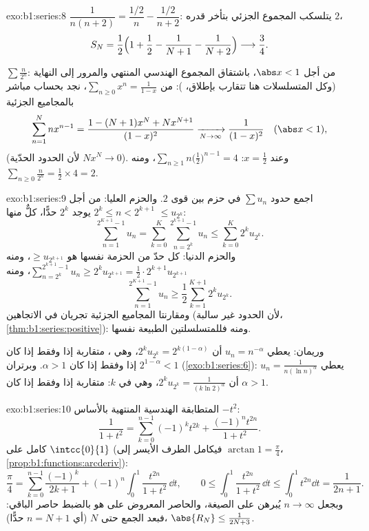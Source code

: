 \begin{solution}{exo:b1:series:8}
$\dfrac{1}{n(n+2)} = \dfrac{1/2}{n} - \dfrac{1/2}{n+2}$: يتلسكب المجموع
الجزئي بتأخر قدره $2$،
\[
S_N = \frac12\Bigl(1 + \frac12 - \frac{1}{N+1} -
\frac{1}{N+2}\Bigr) \longrightarrow \frac34 .
\]

$\sum \frac{n}{2^n}$: من أجل $\abs x < 1$، باشتقاق المجموع
الهندسي المنتهي والمرور إلى النهاية (وكل المتسلسلات هنا تتقارب
بإطلاق، ): من $\sum_{n\geq0} x^n = \frac{1}{1-x}$،
نجد بحساب مباشر بالمجاميع الجزئية
\[
\sum_{n=1}^{N} n x^{n-1}
= \frac{1 - (N+1)x^N + N x^{N+1}}{(1 - x)^2}
\xrightarrow[N\to\infty]{} \frac{1}{(1-x)^2}
\quad (\abs x < 1),
\]
(لأن الحدود الحدّية $N x^N \to 0$). وعند $x = \frac12$:
$\sum_{n\geq1} n\bigl(\frac12\bigr)^{n-1} = 4$، ومنه $\sum_{n\geq0}
\frac{n}{2^n} = \frac12 \times 4 = 2$.
\end{solution}

\begin{solution}{exo:b1:series:9}
اجمع حدود $\sum u_n$ في حزم بين قوى $2$.
والحزم العليا: من أجل $2^k \leq n < 2^{k+1}$ يوجد $2^k$ حدًّا،
كلٌّ منها $\leq u_{2^k}$:
\[
\sum_{n=1}^{2^{K+1}-1} u_n
= \sum_{k=0}^{K} \sum_{n=2^k}^{2^{k+1}-1} u_n
\leq \sum_{k=0}^{K} 2^k u_{2^k} .
\]
والحزم الدنيا: كل حدّ من الحزمة نفسها هو $\geq u_{2^{k+1}}$،
ومنه $\sum_{n=2^k}^{2^{k+1}-1} u_n \geq 2^k u_{2^{k+1}} = \frac12
\cdot 2^{k+1} u_{2^{k+1}}$، ومنه
\[
\sum_{n=1}^{2^{K+1}-1} u_n \geq \frac12 \sum_{k=1}^{K+1} 2^{k}
u_{2^{k}} .
\]
ومقارنتا المجاميع الجزئية تجريان في الاتجاهين (لأن الحدود غير سالبة،
\cref{thm:b1:series:positive}): ومنه فللمتسلسلتين الطبيعة نفسها.

وريمان: يعطي $u_n = n^{-\alpha}$ أن $2^k u_{2^k} =
2^{k(1-\alpha)}$، وهي ، متقاربة إذا وفقط إذا كان $2^{1 - \alpha}
< 1$ إذا وفقط إذا كان $\alpha > 1$. وبرتران
(\cref{exo:b1:series:6}): يعطي $u_n = \frac{1}{n(\ln n)^\alpha}$ أن
$2^k u_{2^k} = \frac{1}{(k\ln 2)^\alpha}$، وهي  في $k$:
متقاربة إذا وفقط إذا كان $\alpha > 1$.
\end{solution}

\begin{solution}{exo:b1:series:10}
المتطابقة الهندسية المنتهية بالأساس $-t^2$:
\[
\frac{1}{1 + t^2} = \sum_{k=0}^{n-1} (-1)^k t^{2k}
+ \frac{(-1)^n t^{2n}}{1 + t^2} .
\]
كامل على $\intcc{0}{1}$ (فيكامل الطرف الأيسر إلى $\arctan
1 = \frac\pi4$، \cref{prop:b1:functions:arcderiv}):
\[
\frac{\pi}{4} = \sum_{k=0}^{n-1} \frac{(-1)^k}{2k+1}
+ (-1)^n \int_0^1 \frac{t^{2n}}{1+t^2}\,\dd t,
\qquad
0 \leq \int_0^1 \frac{t^{2n}}{1+t^2}\,\dd t \leq \int_0^1 t^{2n}\dd
t = \frac{1}{2n+1} .
\]
وبجعل $n \to \infty$ يُبرهن على الصيغة، والحاصر المعروض
على  هو بالضبط حاصر الباقي: فبعد الجمع حتى
$N$ (أي $n = N + 1$ حدًّا)، $\abs{R_N} \leq \frac{1}{2N + 3}$.
\end{solution}

